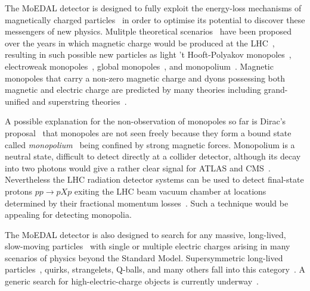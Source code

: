 The MoEDAL detector is designed to fully exploit the energy-loss mechanisms of magnetically charged particles~\cite{Dirac:1931kp,Dirac:1948um,tHooft:1974kcl,Polyakov:1974ek} in order to optimise its potential to discover these messengers of new physics. Mulitple theoretical scenarios~\cite{monopole-review} have been proposed over the years in which magnetic charge would be produced at the LHC~\cite{Acharya:2014nyr}, resulting in such possible new particles as light 't Hooft-Polyakov monopoles~\cite{tHooft:1974kcl,Polyakov:1974ek,Vento:2013jua}, electroweak monopoles~\cite{Cho:1996qd,Bae:2002bm,Cho:2012bq,Cho:2016npz,Ellis:2016glu}, global monopoles~\cite{Barriola:1989hx,Drukier:1981fq,Mazur:1990ak,Mavromatos:2017qeb,Mavromatos:2016mnj,Mavromatos:2018drr}, and monopolium~\cite{Dirac:1948um,Zeldovich:1978wj,Hill:1982iq,Dubrovich:2002gp}. Magnetic monopoles that carry a non-zero magnetic charge and dyons possessing both magnetic and electric charge are predicted by many theories including grand-unified and superstring theories~\cite{Rajantie:2012xh,Rajantie:2016paj,Kephart:2017esj}.

A possible explanation for the non-observation of monopoles so far is Dirac's proposal~\cite{Dirac:1931kp,Dirac:1948um,Zeldovich:1978wj} that monopoles are not seen freely because they form a bound state called \emph{monopolium}~\cite{Hill:1982iq,Dubrovich:2002gp,Epele:2007ic,Epele:2008un} being confined by strong magnetic forces. Monopolium is a neutral state, difficult to detect directly at a collider detector, although its decay into two photons would give a rather clear signal for ATLAS and CMS~\cite{Epele:2016wps}. Nevertheless the LHC radiation detector systems can be used to detect final-state protons $pp\to pXp$ exiting the LHC beam vacuum chamber at locations determined by their fractional momentum losses~\cite{Kalliokoski:2016fjr}. Such a technique would be appealing for detecting monopolia.

The MoEDAL detector is also designed to search for any massive, long-lived, slow-moving particles~\cite{Fairbairn:2006gg,Burdin:2014xma} with single or multiple electric charges arising in many scenarios of physics beyond the Standard Model. Supersymmetric long-lived particles~\cite{moedal-susy}, quirks, strangelets, Q-balls, and many others fall into this category~\cite{Acharya:2014nyr}. A generic search for high-electric-charge objects is currently underway~\cite{moedal-hecos}.


